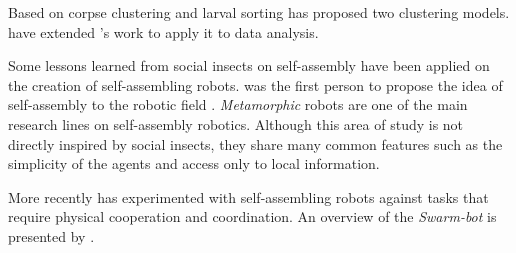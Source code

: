 Based on corpse clustering and larval sorting \citeauthor{citeulike:1646663} \cite{citeulike:1646663} has proposed two clustering models.  \citeauthor{lumer_faieta_1994} \cite{lumer_faieta_1994} have extended \citeauthor{citeulike:1646663}'s work to apply it to data analysis.

Some lessons learned from social insects on self-assembly have been applied on the creation of self-assembling robots. \citeauthor{100066} \cite{100066} was the first person to propose the idea of self-assembly to the robotic field \cite{bonabeau1999swarm}. \emph{Metamorphic} robots \cite{Chirikjian94} are one of the main research lines on self-assembly robotics. Although this area of study is not directly inspired by social insects, they share many common features such as the simplicity of the agents and access only to local information.

More recently \citeauthor{Dorigo05swarm-bot:an} \cite{Dorigo05swarm-bot:an} has experimented with self-assembling robots against tasks that require physical cooperation and coordination. An overview of the \emph{Swarm-bot} \cite{Dorigo05swarm-bot:an} is presented by \citeauthor{6094854} \cite{6094854}.





